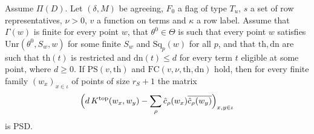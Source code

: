 \begin{theorem}\label{pf:thmS-leaves:thm:dompoints}
Assume $\Pi(D)$. Let $(\delta,M)$ be agreeing, $F_0$ a flag of type $T_u$, $s$ a set of row representatives, $\nu>0$, $v$ a
function on terms and $\kappa$ a row label. Assume that $\Gamma(w)$ is finite for every point $w$, that $\theta^0\in\Theta$ is
such that every point $w$ satisfies $\mathrm{Unr}(\theta^0,S_w,w)$ for some finite $S_w$ and $\mathrm{Sq}_p(w)$ for all $p$, and
that $\mathrm{th},\mathrm{dn}$ are such that $\mathrm{th}(t)$ is restricted and $\mathrm{dn}(t)\le d$ for every term $t$
eligible at some point, where $d\ge0$. If $\mathrm{PS}(v,\mathrm{th})$ and $\mathrm{FC}(v,\nu,\mathrm{th},\mathrm{dn})$ hold, then
for every finite family $(w_x)_{x\in\iota}$ of points of size $r_S+1$ the matrix
\[
\Bigl(d\,K^{\mathrm{top}}(w_x,w_y)-\sum_\rho\hat c_\rho(w_x)\overline{\hat c_\rho(w_y)}\Bigr)_{x,y\in\iota}
\]
is PSD.
\end{theorem}

